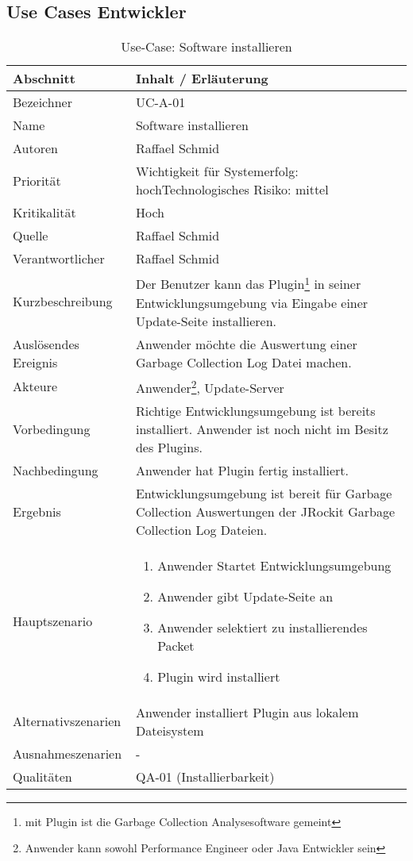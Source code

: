 \subsection{Use Cases Entwickler}
\begin{longtable}{|p{4cm}|p{10.5cm}|}
  \caption{Use-Case: Software installieren}\\\hline
   \textbf{Abschnitt} & \textbf{Inhalt / Erläuterung} \\\hline
   Bezeichner & UC-A-01\\\hline
   Name & Software installieren\\\hline
   Autoren & Raffael Schmid\\\hline
   Priorität & Wichtigkeit für Systemerfolg: hoch\newline Technologisches Risiko: mittel\\\hline
   Kritikalität & Hoch\\\hline
   Quelle & Raffael Schmid\\\hline
   Verantwortlicher & Raffael Schmid\\\hline
   Kurzbeschreibung & Der Benutzer kann das Plugin\footnote{mit Plugin ist die Garbage Collection Analysesoftware gemeint} in seiner Entwicklungsumgebung via Eingabe einer Update-Seite installieren.\\\hline
   Auslösendes Ereignis & Anwender möchte die Auswertung einer Garbage Collection Log Datei machen.\\\hline
   Akteure & Anwender\footnote{Anwender kann sowohl Performance Engineer oder Java Entwickler sein}, Update-Server\\\hline
   Vorbedingung & Richtige Entwicklungsumgebung ist bereits installiert. Anwender ist noch nicht im Besitz des Plugins.\\\hline
   Nachbedingung & Anwender hat Plugin fertig installiert.\\\hline
   Ergebnis & Entwicklungsumgebung ist bereit für Garbage Collection Auswertungen der JRockit Garbage Collection Log Dateien.\\\hline
   Hauptszenario & 
         \begin{enumerate}
		\item Anwender Startet Entwicklungsumgebung
		\item Anwender gibt Update-Seite an
		\item Anwender selektiert zu installierendes Packet
		\item Plugin wird installiert	
 	\end{enumerate}
	\\\hline
   Alternativszenarien & Anwender installiert Plugin aus lokalem Dateisystem\\\hline
   Ausnahmeszenarien & -\\\hline
   Qualitäten & QA-01 (Installierbarkeit)\\\hline
\end{longtable}

